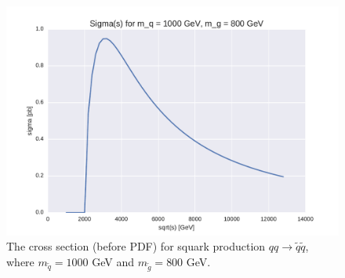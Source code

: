 \documentclass[11pt]{article}
\begin{document}
\begin{figure}[H]
\centering
\includegraphics[scale=0.7]{plots/sigma_diff_test.pdf}
\caption{The cross section (before PDF) for squark production $qq \rightarrow \tilde{q} \tilde{q}$, where $m_{\tilde{q}}= 1000$ GeV and $m_{\tilde{g}}=800$ GeV.}
\label{fig:: sigma_diff 800 1000}
\end{figure}
\end{document}
